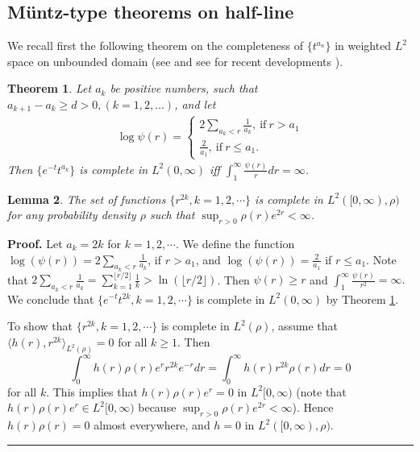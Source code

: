 \documentclass[]{elsarticle}
\newcommand{\FL}[1]{\textcolor{blue}{{#1}}}
\newtheorem{theorem}{Theorem}
\newtheorem{lemma}[theorem]{Lemma}
\newenvironment{proof}[1][Proof]{\noindent\textbf{#1.} }{\ \rule{0.5em}{0.5em}}
\numberwithin{equation}{section}
\numberwithin{theorem}{section}
\newcommand{\ZL}[1]{\textcolor{green}{{#1}}}
\begin{document}


\subsection{M\"untz-type theorems on half-line}
We recall first the following theorem on the completeness of $\{t^{a_n}\}$ in weighted $L^2$ space on unbounded domain (see \cite{Fuchs1946, boas1946properties} and see \cite{gao2005generalized, horvath2014muntz} for recent developments ).
\begin{theorem}\label{t510}
Let $a_k$ be positive numbers, such that $a_{k+1}-a_k\geq d>0, (k=1,2,\ldots)$, and let 
\begin{eqnarray*}
\log \psi(r)=\begin{cases}2\sum_{a_k<r}\frac{1}{a_k},\ \mathrm{if}\ r>a_1\\\frac{2}{a_1},\ \mathrm{if}\ r\leq a_1.\end{cases}
\end{eqnarray*}
Then $\{e^{-t}t^{a_k}\}$ is complete in $L^2(0,\infty)$ iff
$\int_1^{\infty}\frac{\psi(r)}{r}dr=\infty$.
\end{theorem}

\begin{lemma}\label{lemma:Muntz} 
The set of functions $\{r^{2k}, k=1,2,\cdots\}$ is complete in $L^2([0,\infty), \rho)$ for any probability density $\rho$ such that $\sup_{r>0} \rho(r)e^{2r}<\infty$.  
\end{lemma}\vspace{-2mm}
\begin{proof} Let $a_k=2k$ for $k=1,2,\cdots$.
We define the function $\log(\psi(r))=2\sum_{a_k<r}\frac{1}{a_k}$, if $r>a_1$, and $\log(\psi(r))=\frac{2}{a_1}$ if $r\leq a_1$. Note that $2\sum_{a_k<r}\frac{1}{a_k} = \sum_{k=1}^{\lfloor{r/2 \rfloor}} \frac{1}{k} >  \ln(\lfloor{r/2 \rfloor})$. Then $\psi(r)\geq r$ and  
$\int_{1}^{\infty}\frac{\psi(r)}{r^2}=\infty.$
We conclude that  $\{e^{-t}t^{2k}, k=1,2,\cdots\}$ is complete in $L^2(0,\infty)$ by Theorem \ref{t510}. 

To show that $\{r^{2k}, k=1,2,\cdots\}$ is complete in $L^2(\rho)$, assume that 
$\langle h (r),r^{2k}\rangle_{L^2(\rho)}=0$ for all $k\geq 1$.  Then
\[ \int_{0}^{\infty}h (r)\rho(r)e^{r} r^{2k} e^{-r}dr = \int_{0}^{\infty}h (r)r^{2k}\rho(r)dr=0\]
 for all $k$. This implies that $h(r)\rho(r) e^{r}=0$ in $L^2[0,\infty)$ (note that  $h(r)\rho(r) e^{r} \in L^2[0,\infty) $ because $\sup_{r>0}\rho(r)e^{2r}<\infty$).  Hence $h(r)\rho(r)=0$ almost everywhere, and $h=0$ in $L^2([0,\infty),\rho)$.  
\end{proof}
\end{document}
